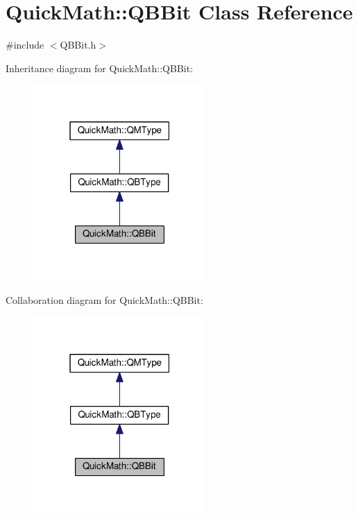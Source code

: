 \hypertarget{classQuickMath_1_1QBBit}{}\section{Quick\+Math\+:\+:Q\+B\+Bit Class Reference}
\label{classQuickMath_1_1QBBit}


{\ttfamily \#include $<$Q\+B\+Bit.\+h$>$}



Inheritance diagram for Quick\+Math\+:\+:Q\+B\+Bit\+:
\nopagebreak
\begin{figure}[H]
\begin{center}
\leavevmode
\includegraphics[width=187pt]{classQuickMath_1_1QBBit__inherit__graph}
\end{center}
\end{figure}


Collaboration diagram for Quick\+Math\+:\+:Q\+B\+Bit\+:
\nopagebreak
\begin{figure}[H]
\begin{center}
\leavevmode
\includegraphics[width=187pt]{classQuickMath_1_1QBBit__coll__graph}
\end{center}
\end{figure}
